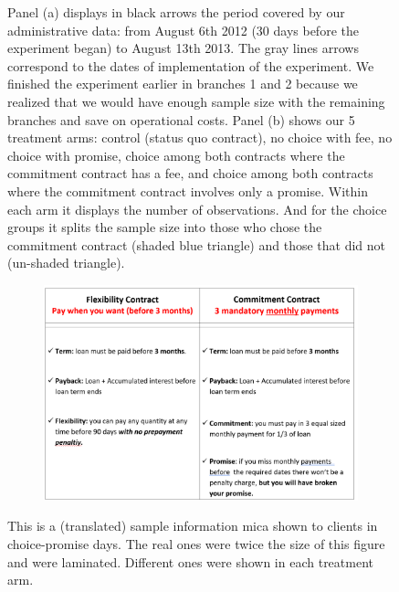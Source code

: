 \documentclass[11pt]{article}
\begin{document}
\begin{figure}[H]
         \scriptsize Panel (a) displays in black arrows the period covered by our administrative data: from August 6th 2012 (30 days before the experiment began) to August 13th 2013. The gray lines arrows correspond to the dates of implementation of the experiment. We finished the experiment earlier in branches 1 and 2 because we realized that we would have enough sample size with the remaining branches and save on operational costs. Panel (b) shows our 5 treatment arms: control (status quo contract), no choice with fee, no choice with promise, choice among both contracts where the commitment contract has a fee, and choice among both contracts where the commitment contract involves only a promise. Within each arm it displays the number of observations. And  for the choice groups it splits the sample size into those who chose the commitment contract (shaded blue triangle) and those that did not (un-shaded triangle).
\end{figure}



\begin{figure}[H]
     \caption{Explanatory Material: Promise-Choice Days}
    \label{ExplanatoryMaterial}
    \begin{center}
    \begin{subfigure}{0.8\textwidth}
        \centering
        \includegraphics[width=\textwidth]{Figuras/MicaChoiceDonde.png}
    \end{subfigure}
    \end{center}
    \scriptsize
        This is a (translated) sample information mica shown to clients in choice-promise days. The real ones were twice the size of this figure and were laminated. Different ones were shown in each treatment arm.
\end{figure}
\end{document}
